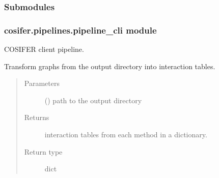 \documentclass[letterpaper,10pt,english]{sphinxmanual}
\begin{document}
\subsubsection{Submodules}
\label{\detokenize{_modules/cosifer.pipelines:submodules}}

\subsubsection{cosifer.pipelines.pipeline\_cli module}
\label{\detokenize{_modules/cosifer.pipelines:module-cosifer.pipelines.pipeline_cli}}\label{\detokenize{_modules/cosifer.pipelines:cosifer-pipelines-pipeline-cli-module}}
COSIFER client pipeline.

\begin{fulllineitems}
\label{\detokenize{_modules/cosifer.pipelines:cosifer.pipelines.pipeline_cli.get_interaction_tables}}
Transform graphs from the output directory into interaction tables.
\begin{quote}\begin{description}
\item[{Parameters}] \leavevmode
{} () \textendash{} path to the output directory

\item[{Returns}] \leavevmode
interaction tables from each method in a dictionary.

\item[{Return type}] \leavevmode
dict

\end{description}\end{quote}

\end{fulllineitems}

\end{document}

